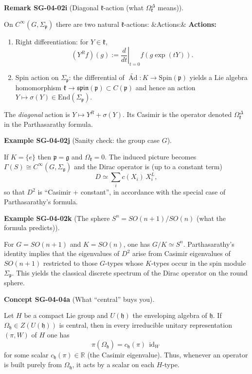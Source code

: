 \documentclass[10pt, letterpaper]{article}
\newcommand{\id}{\operatorname{id}}
\newcommand{\Ad}{\operatorname{Ad}}
\newcommand{\R}{\mathbb{R}}
\newcommand{\Cinf}{C^{\infty}}
\newcommand{\End}{\mathrm{End}}
\newcommand{\Spin}{\mathrm{Spin}}
\newenvironment{romanenum}[1][]
  {%
    \ifx&#1&
    \else
      \textbf{#1}\quad
    \fi
    \begin{enumerate}[label=\roman*)]
  }
  {%
    \end{enumerate}%
  }
\newcommand{\CustomHeading}[3]{%
  \par\medskip\noindent%
  \textbf{#1 #2} \textnormal{(#3)}.\enskip%
}
\newenvironment{REM}[2]{\begin{unitbox}\CustomHeading{Remark}{#1}{#2}}{\end{unitbox}}
\newenvironment{EXA}[2]{\begin{unitbox}\CustomHeading{Example}{#1}{#2}}{\end{unitbox}}
\newenvironment{CONC}[2]{\begin{unitbox}\CustomHeading{Concept}{#1}{#2}}{\end{unitbox}}
\begin{document}
\begin{REM}{SG-04-02i}{Diagonal $\mathfrak k$-action (what $\Omega_{\mathfrak k}^{\Delta}$ means)}
On $\Cinf(G,\Sigma_{\mathfrak p})$ there are two natural $\mathfrak k$-actions:
\begin{romanenum}[Actions:]
\item Right differentiation: for $Y\in\mathfrak k$,
\[
(Y^R f)(g):=\left.\frac{d}{dt}\right|_{t=0} f(g\exp(tY)).
\]
\item Spin action on $\Sigma_{\mathfrak p}$: the differential of $\widetilde{\Ad}:K\to \Spin(\mathfrak p)$ yields
a Lie algebra homomorphism $\mathfrak k\to \mathfrak{spin}(\mathfrak p)\subset C(\mathfrak p)$ and hence an action
$Y\mapsto \sigma(Y)\in \End(\Sigma_{\mathfrak p})$.
\end{romanenum}
The \emph{diagonal} action is $Y\mapsto Y^R+\sigma(Y)$.
Its Casimir is the operator denoted $\Omega_{\mathfrak k}^{\Delta}$ in the Parthasarathy formula.
\end{REM}

\begin{EXA}{SG-04-02j}{Sanity check: the group case $G$}
If $K=\{e\}$ then $\mathfrak p=\mathfrak g$ and $\Omega_{\mathfrak k}=0$. The induced picture becomes
$\Gamma(S)\cong \Cinf(G,\Sigma_{\mathfrak g})$ and the Dirac operator is (up to a constant term)
\[
D \simeq \sum_i c(X_i)\,X_i^L,
\]
so that $D^2$ is ``Casimir + constant'', in accordance with the special case of Parthasarathy's formula.
\end{EXA}

\begin{EXA}{SG-04-02k}{The sphere $S^n=SO(n+1)/SO(n)$ (what the formula predicts)}
For $G=SO(n+1)$ and $K=SO(n)$, one has $G/K\simeq S^n$.
Parthasarathy's identity implies that the eigenvalues of $D^2$ arise from Casimir eigenvalues of $SO(n+1)$
restricted to those $G$-types whose $K$-types occur in the spin module $\Sigma_{\mathfrak p}$.
This yields the classical discrete spectrum of the Dirac operator on the round sphere.
\end{EXA}


\begin{CONC}{SG-04-04a}{What ``central'' buys you}
Let $H$ be a compact Lie group and $U(\mathfrak h)$ the enveloping algebra of $\mathfrak h$.
If $\Omega_{\mathfrak h}\in Z(U(\mathfrak h))$ is central, then in every irreducible unitary representation
$(\pi,W)$ of $H$ one has
\[
\pi(\Omega_{\mathfrak h}) = c_{\mathfrak h}(\pi)\,\id_W
\]
for some scalar $c_{\mathfrak h}(\pi)\in\R$ (the Casimir eigenvalue).
Thus, whenever an operator is built purely from $\Omega_{\mathfrak h}$, it acts by a scalar on each $H$-type.
\end{CONC}
\end{document}
